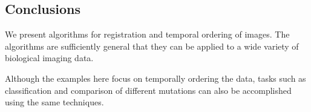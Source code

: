 \documentclass{pnastwo}
\begin{document}
\begin{article}
\section{Conclusions}

We present algorithms for registration and temporal ordering of images.
%
The algorithms are sufficiently general that they can be applied to a wide variety of biological imaging data.

Although the examples here focus on temporally ordering the data, tasks such as classification and comparison of different mutations can also be accomplished using the same techniques. 
%







\end{article}
\end{document}
